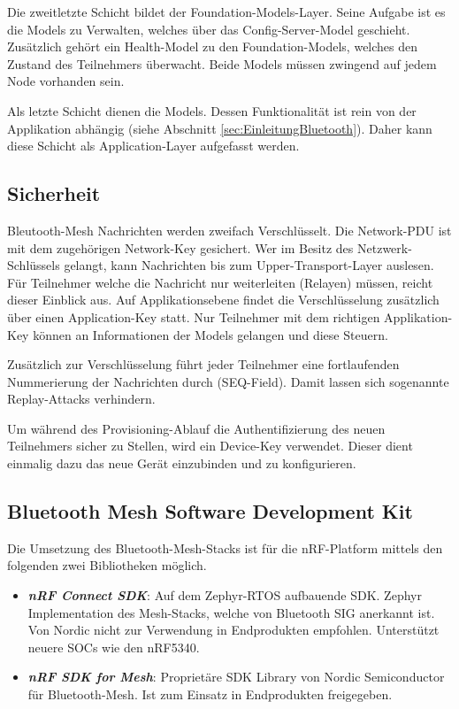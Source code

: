 Die zweitletzte Schicht bildet der Foundation-Models-Layer. Seine Aufgabe ist es die Models zu Verwalten, welches über das Config-Server-Model geschieht. Zusätzlich gehört ein Health-Model zu den Foundation-Models, welches den Zustand des Teilnehmers überwacht. Beide Models müssen zwingend auf jedem Node vorhanden sein. \cite{bluetooth_sig_mesh_netzwerk_spezifikationen_2020} \cite{bluetooth_sig_mesh-technology-overviewpdf_2020}

Als letzte Schicht dienen die Models. Dessen Funktionalität ist rein von der Applikation abhängig (siehe Abschnitt \ref{sec:EinleitungBluetooth}). Daher kann diese Schicht als Application-Layer aufgefasst werden.


\subsection{Sicherheit}\label{subsec:BleutoothMeshSicherheit}
Bleutooth-Mesh Nachrichten werden zweifach Verschlüsselt. Die Network-PDU ist mit dem zugehörigen Network-Key gesichert. Wer im Besitz des Netzwerk-Schlüssels gelangt, kann Nachrichten bis zum Upper-Transport-Layer auslesen. Für Teilnehmer welche die Nachricht nur weiterleiten (Relayen) müssen, reicht dieser Einblick aus. Auf Applikationsebene findet die Verschlüsselung zusätzlich über einen Application-Key statt. Nur Teilnehmer mit dem richtigen Applikation-Key können an Informationen der Models gelangen und diese Steuern.

Zusätzlich zur Verschlüsselung führt jeder Teilnehmer eine fortlaufenden Nummerierung der Nachrichten durch (SEQ-Field). Damit lassen sich sogenannte Replay-Attacks verhindern.

Um während des Provisioning-Ablauf die Authentifizierung des neuen Teilnehmers sicher zu Stellen, wird ein Device-Key verwendet. Dieser dient einmalig dazu das neue Gerät einzubinden und zu konfigurieren. 



\subsection{Bluetooth Mesh Software Development Kit}\label{sec:BluetoothMeshSoftwareDevelopmentKit}
Die Umsetzung des Bluetooth-Mesh-Stacks ist für die nRF-Platform mittels den folgenden zwei Bibliotheken möglich. 

\begin{itemize}
	\item \textit{\textbf{nRF Connect SDK}}: Auf dem Zephyr-RTOS aufbauende SDK. Zephyr Implementation des Mesh-Stacks, welche von Bluetooth SIG anerkannt ist. Von Nordic nicht zur Verwendung in Endprodukten empfohlen. Unterstützt neuere SOCs wie den nRF5340.  \cite{nordic_semi_welcome_to_the_nrf_connect_sdk_2020}
	\item \textit{\textbf{nRF SDK for Mesh}}: Proprietäre SDK Library von Nordic Semiconductor für Bluetooth-Mesh. Ist zum Einsatz in Endprodukten freigegeben. \cite{nordic_semi_nrf_sdk_for_mesh_2020}
\end{itemize}

